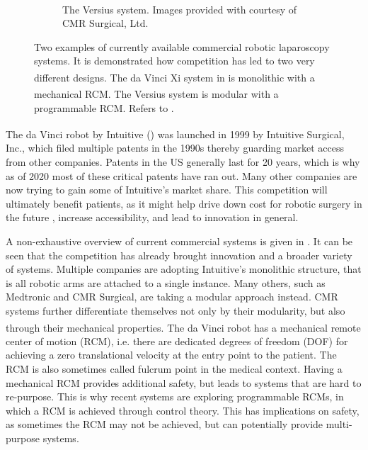 \begin{figure}[tb]
\begin{subfigure}[b]{0.49\textwidth}
        \caption{The Versius\textsuperscript{\textregistered} system. Images provided with courtesy of  CMR Surgical, Ltd.}
        \label{in:fig:versius}
    \end{subfigure}
    \caption{Two examples of currently available commercial robotic laparoscopy systems. It is demonstrated how competition has led to two very different designs. The da Vinci\textsuperscript{\textregistered} Xi system in  is monolithic with a mechanical RCM. The Versius\textsuperscript{\textregistered} system is modular with a programmable RCM. Refers to .}
    \label{in:fig:surgical_systems}
\end{figure}

The da Vinci\textsuperscript{\textregistered} robot by Intuitive () was launched in 1999 by Intuitive Surgical, Inc., which filed multiple patents in the 1990s thereby guarding market access from other companies. Patents in the US generally last for 20 years, which is why as of 2020 most of these critical patents have ran out. Many other companies are now trying to gain some of Intuitive's market share. This competition will ultimately benefit patients, as it might help drive down cost for robotic surgery in the future \cite{patel2021can}, increase accessibility, and lead to innovation in general. 

A non-exhaustive overview of current commercial systems is given in . It can be seen that the competition has already brought innovation and a broader variety of systems. Multiple companies are adopting Intuitive's monolithic structure, that is all robotic arms are attached to a single instance. Many others, such as Medtronic and CMR Surgical, are taking a modular approach instead. CMR systems further differentiate themselves not only by their modularity, but also through their mechanical properties. The da Vinci\textsuperscript{\textregistered} robot has a mechanical remote center of motion (RCM), i.e. there are dedicated degrees of freedom (DOF) for achieving a zero translational velocity at the entry point to the patient. The RCM is also sometimes called fulcrum point in the medical context. Having a mechanical RCM provides additional safety, but leads to systems that are hard to re-purpose. This is why recent systems are exploring programmable RCMs, in which a RCM is achieved through control theory. This has implications on safety, as sometimes the RCM may not be achieved, but can potentially provide multi-purpose systems. 

